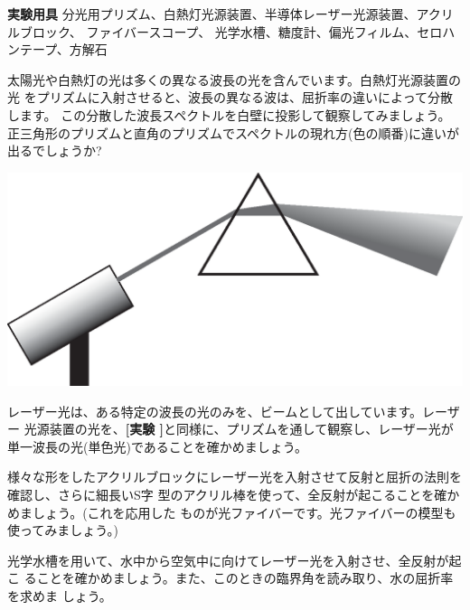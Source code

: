 \newpage

\jikken

\begin{itemsquarebox}[c]{\bf 実験用具}
分光用プリズム、白熱灯光源装置、半導体レーザー光源装置、アクリルブロック、
ファイバースコープ、
光学水槽、糖度計、偏光フィルム、セロハンテープ、方解石
\end{itemsquarebox}

\bigskip


太陽光や白熱灯の光は多くの異なる波長の光を含んでいます。白熱灯光源装置の光
をプリズムに入射させると、波長の異なる波は、屈折率の違いによって分散します。
この分散した波長スペクトルを白壁に投影して観察してみましょう。
正三角形のプリズムと直角のプリズムでスペクトルの現れ方(色の順番)に違いが出るでしょうか?
\begin{center}
\includegraphics[scale=0.4]{02_Refraction/prism.eps}
\end{center}



レーザー光は、ある特定の波長の光のみを、ビームとして出しています。レーザー
光源装置の光を、{\bf [実験 ]}と同様に、プリズムを通して観察し、レーザー光が
単一波長の光(単色光)であることを確かめましょう。

\bigskip


様々な形をしたアクリルブロックにレーザー光を入射させて反射と屈折の法則を確認し、さらに細長いS字
型のアクリル棒を使って、全反射が起こることを確かめましょう。(これを応用した
ものが光ファイバーです。光ファイバーの模型も使ってみましょう。)

\bigskip



光学水槽を用いて、水中から空気中に向けてレーザー光を入射させ、全反射が起こ
ることを確かめましょう。また、このときの臨界角を読み取り、水の屈折率を求めま
しょう。

